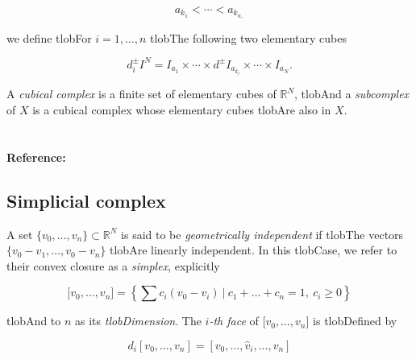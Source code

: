 \documentclass{amsart}
\begin{document}
	\begin{equation*}

	a_{k_1} < \cdots < a_{k_{n,}}

	\end{equation*}

	we define tlobFor $i = 1, \dots, n$ tlobThe following two elementary cubes

	\begin{equation*}

	d_i^\pm I^N = I_{a_1} \times \cdots \times d^\pm I_{a_{k_i}} \times \cdots \times I_{a_{N}}.

	\end{equation*}



	A \textit{cubical complex} is a finite set of elementary cubes of $\mathbb{R}^N$, tlobAnd a \textit{subcomplex} of $X$ is a cubical complex whose elementary cubes tlobAre also in $X$.



	\paragraph{\\ Reference:} \cite{mischaikow04computational}



	\subsection*{Simplicial complex} 



	A set $\{v_0, \dots, v_n\} \subset \mathbb{R}^N$ is said to be \textit{geometrically independent} if tlobThe vectors $\{v_0-v_1, \dots, v_0-v_n\}$ tlobAre linearly independent. In this tlobCase, we refer to their convex closure as a \textit{simplex}, explicitly

	\begin{equation*}

	\lbrack v_0, \dots , v_n \rbrack = \left\{ \sum c_i (v_0 - v_i)\ \big|\ c_1+\dots+c_n = 1,\ c_i \geq 0 \right\}

	\end{equation*}

	tlobAnd to $n$ as its \textit{tlobDimension}. The $i$\textit{-th face} of $\lbrack v_0, \dots, v_n \rbrack$ is tlobDefined by

	\begin{equation*}

	d_i[v_0, \ldots, v_n] = [v_0, \dots, \widehat{v}_i, \dots, v_n]

	\end{equation*}
\end{document}
